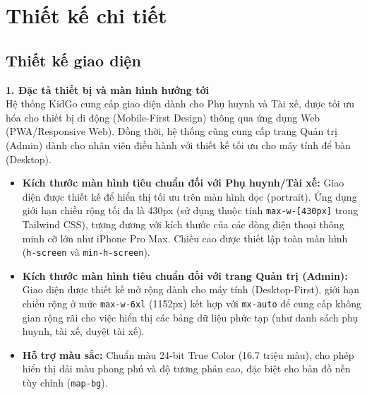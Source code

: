 \documentclass[../DoAn.tex]{subfiles}
\begin{document}
\section{Thiết kế chi tiết}
\subsection{Thiết kế giao diện}
\textbf{1. Đặc tả thiết bị và màn hình hướng tới} \\
Hệ thống KidGo cung cấp giao diện dành cho Phụ huynh và Tài xế, được tối ưu hóa cho thiết bị di động (Mobile-First Design) thông qua ứng dụng Web (PWA/Responsive Web). Đồng thời, hệ thống cũng cung cấp trang Quản trị (Admin) dành cho nhân viên điều hành với thiết kế tối ưu cho máy tính để bàn (Desktop).
\begin{itemize}
    \item \textbf{Kích thước màn hình tiêu chuẩn đối với Phụ huynh/Tài xế:} Giao diện được thiết kế để hiển thị tối ưu trên màn hình dọc (portrait). Ứng dụng giới hạn chiều rộng tối đa là 430px (sử dụng thuộc tính \texttt{max-w-[430px]} trong Tailwind CSS), tương đương với kích thước của các dòng điện thoại thông minh cỡ lớn như iPhone Pro Max. Chiều cao được thiết lập toàn màn hình (\texttt{h-screen} và \texttt{min-h-screen}).
    \item \textbf{Kích thước màn hình tiêu chuẩn đối với trang Quản trị (Admin):} Giao diện được thiết kế mở rộng dành cho máy tính (Desktop-First), giới hạn chiều rộng ở mức \texttt{max-w-6xl} (1152px) kết hợp với \texttt{mx-auto} để cung cấp không gian rộng rãi cho việc hiển thị các bảng dữ liệu phức tạp (như danh sách phụ huynh, tài xế, duyệt tài xế).
    \item \textbf{Hỗ trợ màu sắc:} Chuẩn màu 24-bit True Color (16.7 triệu màu), cho phép hiển thị dải màu phong phú và độ tương phản cao, đặc biệt cho bản đồ nền tùy chỉnh (\texttt{map-bg}).
\end{itemize}
\end{document}
